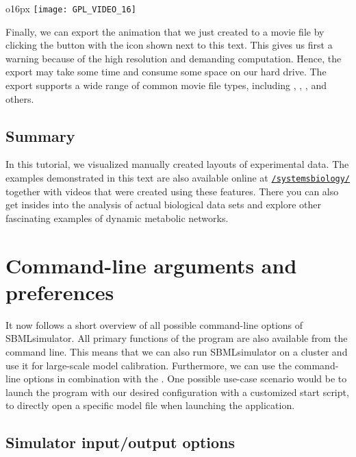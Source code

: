 \begin{wrapfigure}{o}{16px}
\vspace{\wrapfigspace}
\vspace{.35cm}
\texttt{[image: GPL\_VIDEO\_16]}
\end{wrapfigure}
Finally, we can export the animation that we just created to a movie file by clicking the button with the icon shown next to this text.
This gives us first a warning because of the high resolution and demanding computation.
Hence, the export may take some time and consume some space on our hard drive.
The export supports a wide range of common movie file types, including \AVI, \MOV, \MPG, and others.


\section{Summary}

In this tutorial, we visualized manually created layouts of experimental data.
The examples demonstrated in this text are also available online at {\href{https://www.youtube.com/c/systemsbiology/}{\faYoutube\texttt{/systemsbiology/}}} together with videos that were created using these features.
There you can also get insides into the analysis of actual biological data sets and explore other fascinating examples of dynamic metabolic networks.



\chapter{Command-line arguments and preferences}
\label{chap:CMD}

It now follows a short overview of all possible command-line options of SBMLsimulator.
All primary functions of the program are also available from the command line.
This means that we can also run SBMLsimulator on a cluster and use it for large-scale model calibration.
Furthermore, we can use the command-line options in combination with the \GUI.
One possible use-case scenario would be to launch the program with our desired configuration with a customized start script, \eg to directly open a specific model file when launching the application.


\renewcommand{\descriptionlabel}[1]{\textcolor{blue}{\texttt{#1}}}

\section{Simulator input/output options}
